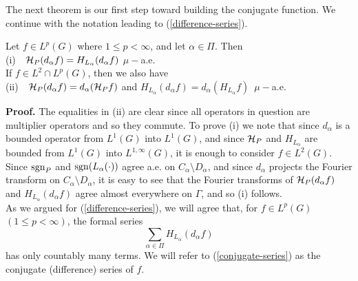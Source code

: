 The next theorem is our first step toward
building the conjugate function.  We continue 
with the notation leading to (\ref{difference-series}).
\begin{conjugate-of-slice}
Let $f\in L^p(G)$ where $1\leq p<\infty$,
and let $\alpha\in \Pi$.  Then\\
(i)\ \ ${\cal H}_P (d_\alpha f)= H_{L_\alpha} (d_\alpha f)$
$\mu-$a.e.\\
If $f\in L^2\cap L^p(G)$, then we also have\\
(ii)\ \ ${\cal H}_P (d_\alpha f)= d_\alpha ({\cal H}_P f)$ and
$H_{L_\alpha} (d_\alpha f)= d_\alpha (H_{L_\alpha} f)$\ $\mu-$a.e.
\label{conjugate-of-slice}
\end{conjugate-of-slice}
{\bf Proof.}  The equalities in  (ii) 
are clear since all operators in question are
multiplier operators and so they commute.  
To prove (i) we note that
since $d_\alpha$ is a bounded operator from
$L^1(G)$ into $L^1(G)$, and since 
${\cal H}_P$ and $H_{L_\alpha}$ are bounded from 
$L^1(G)$ into $L^{1,\infty}(G)$, it is enough
to consider $f\in L^2(G)$.  Since ${\rm sgn}_P$ and
${\rm sgn} (L_\alpha(\cdot))$ agree a.e. on 
$C_\alpha\setminus D_\alpha$, and since 
$d_\alpha$ projects the Fourier transform
on $C_\alpha\setminus D_\alpha$, it 
is easy to see that the Fourier 
transforms of ${\cal H}_P (d_\alpha f)$ and
$ H_{L_\alpha} (d_\alpha f)$ agree almost everywhere
on $\Gamma$,
and so (i) follows.\\
As we argued for (\ref{difference-series}),
we will agree that, for $f\in L^p(G)$
$(1\leq p<\infty)$, the formal
series
\begin{equation}
\sum_{\alpha\in \Pi} H_{L_\alpha}(d_\alpha f)
\label{conjugate-series}
\end{equation} 
has only countably many terms.
We will refer to (\ref{conjugate-series}) as 
the conjugate (difference) series of $f$.\\
